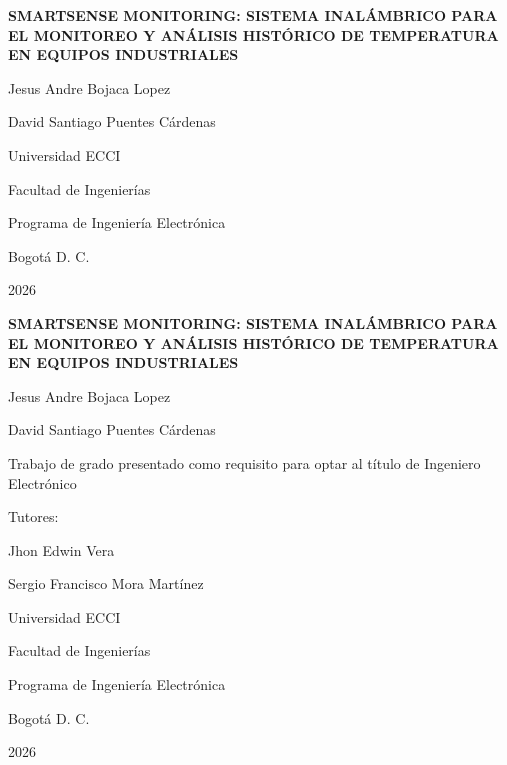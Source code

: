 \begin{titlepage}
\begin{center}
\vspace*{2cm}
{\Large\bfseries SMARTSENSE MONITORING: SISTEMA INALÁMBRICO PARA EL MONITOREO Y ANÁLISIS HISTÓRICO DE TEMPERATURA EN EQUIPOS INDUSTRIALES\par}
\vfill
{\large Jesus Andre Bojaca Lopez\par}
\vspace{0.4cm}
{\large David Santiago Puentes Cárdenas\par}
\vfill
{\large Universidad ECCI\par}
{\large Facultad de Ingenierías\par}
{\large Programa de Ingeniería Electrónica\par}
{\large Bogotá D. C.\par}
{\large 2026\par}
\end{center}
\end{titlepage}

\begin{titlepage}
\begin{center}
\vspace*{1.6cm}
{\Large\bfseries SMARTSENSE MONITORING: SISTEMA INALÁMBRICO PARA EL MONITOREO Y ANÁLISIS HISTÓRICO DE TEMPERATURA EN EQUIPOS INDUSTRIALES\par}
\vfill
{\large Jesus Andre Bojaca Lopez\par}
\vspace{0.4cm}
{\large David Santiago Puentes Cárdenas\par}
\vfill
{\large Trabajo de grado presentado como requisito para optar al título de Ingeniero Electrónico\par}
\vfill
{\large Tutores:\par}
{\large Jhon Edwin Vera\par}
{\large Sergio Francisco Mora Martínez\par}
\vfill
{\large Universidad ECCI\par}
{\large Facultad de Ingenierías\par}
{\large Programa de Ingeniería Electrónica\par}
{\large Bogotá D. C.\par}
{\large 2026\par}
\end{center}
\end{titlepage}

